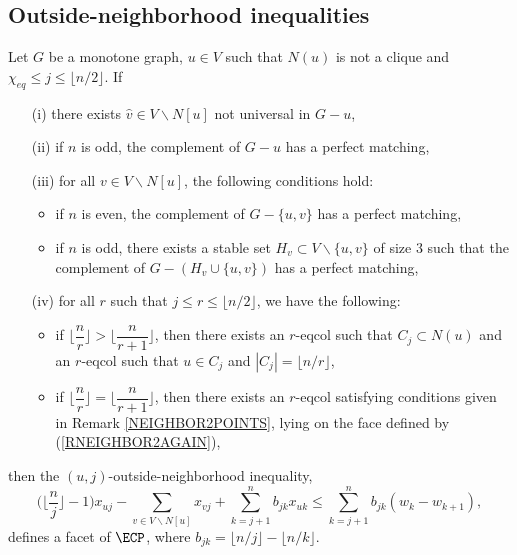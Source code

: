 \subsection{Outside-neighborhood inequalities}

\begin{tthm} \label{TNEIGHBOR2}
Let $G$ be a monotone graph, $u \in V$ such that $N(u)$ is not a clique and $\chi_{eq} \leq j \leq \lfloor n/2 \rfloor$.
If
\begin{enumerate}
\item[(i)] there exists $\hat{v} \in V \backslash N[u]$ not universal in $G - u$, 
\item[(ii)] if $n$ is odd, the complement of $G - u$ has a perfect matching,
\item[(iii)] for all $v \in V \backslash N[u]$, the following conditions hold:
\begin{itemize}
\item if $n$ is even, the complement of $G - \{u, v\}$ has a perfect matching,
\item if $n$ is odd, there exists a stable set $H_v \subset V \backslash \{u, v\}$ of size 3 such that
the complement of $G - (H_v \cup \{u, v\})$ has a perfect matching, \end{itemize}
\item[(iv)] for all $r$ such that $j \leq r \leq \lfloor n/2 \rfloor$, we have the following:
\begin{itemize}
\item if $\biggl\lfloor \dfrac{n}{r} \biggr\rfloor > \biggl\lfloor \dfrac{n}{r+1} \biggr\rfloor$, then there exists an $r$-eqcol such that
      $C_j \subset N(u)$ and an $r$-eqcol such that $u \in C_j$ and $|C_j| = \lfloor n/r \rfloor$,
\item if $\biggl\lfloor \dfrac{n}{r} \biggr\rfloor = \biggl\lfloor \dfrac{n}{r+1} \biggr\rfloor$, then there exists an $r$-eqcol satisfying conditions given in Remark \ref{NEIGHBOR2POINTS}, \ie lying on the face defined by (\ref{RNEIGHBOR2AGAIN}),
\end{itemize}
\end{enumerate}
then the $(u,j)$-outside-neighborhood inequality, \ie
\begin{equation} \label{RNEIGHBOR2AGAIN}
\biggl(\biggl\lfloor \dfrac{n}{j} \biggr\rfloor - 1 \biggr) x_{uj} - \sum_{v \in V \backslash N[u]} x_{vj}
+ \sum_{k = j+1}^n b_{jk} x_{uk} \leq \sum_{k = j+1}^{n} b_{jk} (w_k - w_{k+1}),
\end{equation}
defines a facet of $\ECP$, where $b_{jk} = \lfloor n/j \rfloor - \lfloor n/k \rfloor$.
\end{tthm}
